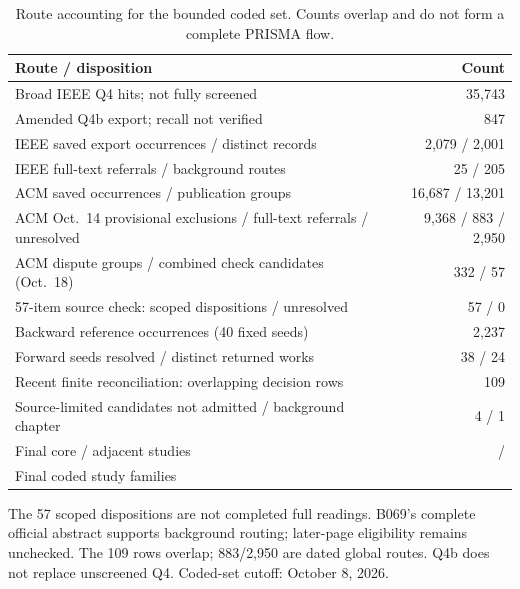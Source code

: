 \begin{table}[htbp]
\centering\small
\caption{Route accounting for the bounded coded set. Counts overlap and do not form a complete PRISMA flow.}
\label{tab:selection-flow}
\begin{tabularx}{\columnwidth}{@{}Yr@{}}
\toprule
Route / disposition & Count\\
\midrule
Broad IEEE Q4 hits; not fully screened & 35,743\\
Amended Q4b export; recall not verified & 847\\
IEEE saved export occurrences / distinct records & 2,079 / 2,001\\
IEEE full-text referrals / background routes & 25 / 205\\
ACM saved occurrences / publication groups & 16,687 / 13,201\\
ACM Oct.\ 14 provisional exclusions / full-text referrals / unresolved & 9,368 / 883 / 2,950\\
ACM dispute groups / combined check candidates (Oct.\ 18) & 332 / 57\\
57-item source check: scoped dispositions / unresolved & 57 / 0\\
Backward reference occurrences (40 fixed seeds) & 2,237\\
Forward seeds resolved / distinct returned works & 38 / 24\\
Recent finite reconciliation: overlapping decision rows & 109\\
Source-limited candidates not admitted / background chapter & 4 / 1\\
Final core / adjacent studies & \FinalCore{} / \FinalAdjacent{}\\
Final coded study families & \FinalN{}\\
\bottomrule
\end{tabularx}
\par\smallskip\footnotesize The 57 scoped dispositions are not completed full readings. B069's complete official abstract supports background routing; later-page eligibility remains unchecked. The 109 rows overlap; 883/2,950 are dated global routes. Q4b does not replace unscreened Q4. Coded-set cutoff: October 8, 2026.
\end{table}
